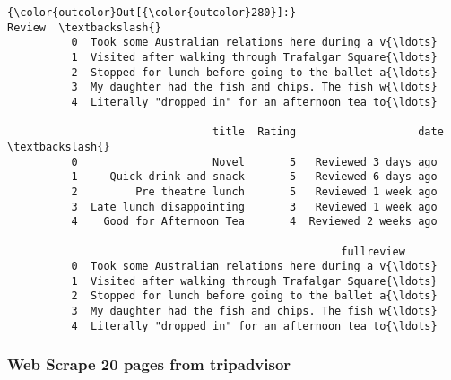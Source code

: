 \documentclass[11pt]{article}
\begin{document}
\begin{Verbatim}[commandchars=\\\{\}]
{\color{outcolor}Out[{\color{outcolor}280}]:}                                               Review  \textbackslash{}
          0  Took some Australian relations here during a v{\ldots}   
          1  Visited after walking through Trafalgar Square{\ldots}   
          2  Stopped for lunch before going to the ballet a{\ldots}   
          3  My daughter had the fish and chips. The fish w{\ldots}   
          4  Literally "dropped in" for an afternoon tea to{\ldots}   
          
                                title  Rating                   date  \textbackslash{}
          0                     Novel       5   Reviewed 3 days ago    
          1     Quick drink and snack       5   Reviewed 6 days ago    
          2         Pre theatre lunch       5   Reviewed 1 week ago    
          3  Late lunch disappointing       3   Reviewed 1 week ago    
          4    Good for Afternoon Tea       4  Reviewed 2 weeks ago    
          
                                                    fullreview  
          0  Took some Australian relations here during a v{\ldots}  
          1  Visited after walking through Trafalgar Square{\ldots}  
          2  Stopped for lunch before going to the ballet a{\ldots}  
          3  My daughter had the fish and chips. The fish w{\ldots}  
          4  Literally "dropped in" for an afternoon tea to{\ldots}  
\end{Verbatim}
            
    \subsubsection{Web Scrape 20 pages from
tripadvisor}\label{web-scrape-20-pages-from-tripadvisor}
\end{document}
